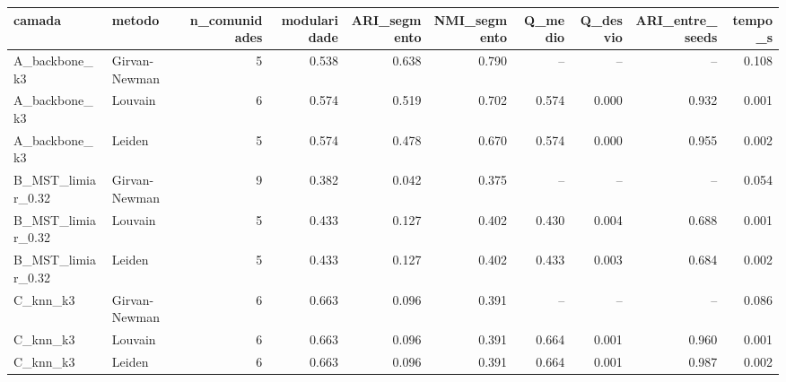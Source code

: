 \begin{tabular}{llrrrrrrrr}
\toprule
camada & metodo & n\_comunidades & modularidade & ARI\_segmento & NMI\_segmento & Q\_medio & Q\_desvio & ARI\_entre\_seeds & tempo\_s \\
\midrule
A\_backbone\_k3 & Girvan-Newman & 5 & 0.538 & 0.638 & 0.790 & -- & -- & -- & 0.108 \\
A\_backbone\_k3 & Louvain & 6 & 0.574 & 0.519 & 0.702 & 0.574 & 0.000 & 0.932 & 0.001 \\
A\_backbone\_k3 & Leiden & 5 & 0.574 & 0.478 & 0.670 & 0.574 & 0.000 & 0.955 & 0.002 \\
B\_MST\_limiar\_0.32 & Girvan-Newman & 9 & 0.382 & 0.042 & 0.375 & -- & -- & -- & 0.054 \\
B\_MST\_limiar\_0.32 & Louvain & 5 & 0.433 & 0.127 & 0.402 & 0.430 & 0.004 & 0.688 & 0.001 \\
B\_MST\_limiar\_0.32 & Leiden & 5 & 0.433 & 0.127 & 0.402 & 0.433 & 0.003 & 0.684 & 0.002 \\
C\_knn\_k3 & Girvan-Newman & 6 & 0.663 & 0.096 & 0.391 & -- & -- & -- & 0.086 \\
C\_knn\_k3 & Louvain & 6 & 0.663 & 0.096 & 0.391 & 0.664 & 0.001 & 0.960 & 0.001 \\
C\_knn\_k3 & Leiden & 6 & 0.663 & 0.096 & 0.391 & 0.664 & 0.001 & 0.987 & 0.002 \\
\bottomrule
\end{tabular}
